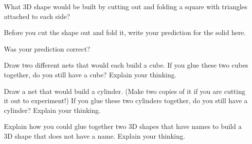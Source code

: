 \documentclass[nooutcomes,noauthor]{ximera}
\begin{document}
\begin{problem}
What 3D shape would be built by cutting out and folding a square with triangles attached to each side?

Before you cut the shape out and fold it, write your prediction for the solid here.

\begin{image}
\end{image}


Was your prediction correct?
\end{problem}


\begin{problem}
Draw two different nets that would each build a cube. If you glue these two cubes together, do you still have a cube? Explain your thinking.
\end{problem}


\begin{problem}
Draw a net that would build a cylinder. (Make two copies of it if you are cutting it out to experiment!) If you glue these two cylinders together, do you still have a cylinder? Explain your thinking.
\end{problem}


\begin{problem}
Explain how you could glue together two 3D shapes that have names to build a 3D shape that does not have a name. Explain your thinking.
\end{problem}





\newpage
\end{document}
